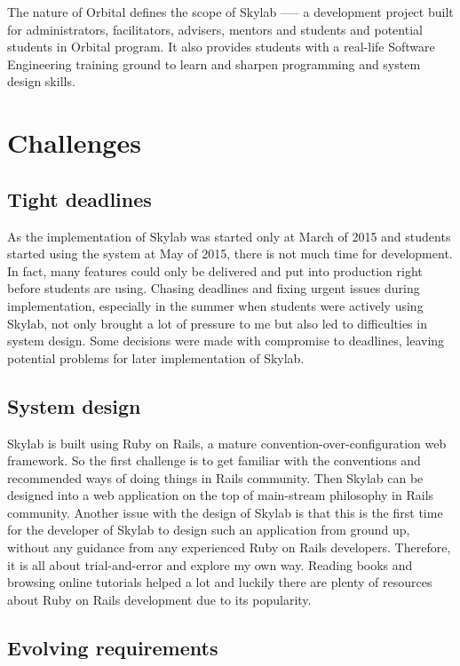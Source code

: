 The nature of Orbital defines the scope of Skylab —-- a development project built for administrators, facilitators, advisers, mentors and students and potential students in Orbital program. It also provides students with a real-life Software Engineering training ground to learn and sharpen programming and system design skills.

\section{Challenges}

\subsection{Tight deadlines}

As the implementation of Skylab was started only at March of 2015 and students started using the system at May of 2015, there is not much time for development. In fact, many features could only be delivered and put into production right before students are using. Chasing deadlines and fixing urgent issues during implementation, especially in the summer when students were actively using Skylab, not only brought a lot of pressure to me but also led to difficulties in system design. Some decisions were made with compromise to deadlines, leaving potential problems for later implementation of Skylab.

\subsection{System design}

Skylab is built using Ruby on Rails, a mature convention-over-configuration web framework. So the first challenge is to get familiar with the conventions and recommended ways of doing things in Rails community. Then Skylab can be designed into a web application on the top of main-stream philosophy in Rails community. Another issue with the design of Skylab is that this is the first time for the developer of Skylab to design such an application from ground up, without any guidance from any experienced Ruby on Rails developers. Therefore, it is all about trial-and-error and explore my own way. Reading books and browsing online tutorials helped a lot and luckily there are plenty of resources about Ruby on Rails development due to its popularity.

\subsection{Evolving requirements}

